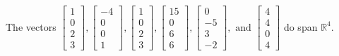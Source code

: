 \begin{exercise}
\begin{exerciseStatement}
  \end{exerciseStatement}
  \begin{exerciseAnswer}
   The vectors \(\left[\begin{array}{r}
1 \\
0 \\
2 \\
3
\end{array}\right] , \left[\begin{array}{r}
-4 \\
0 \\
0 \\
1
\end{array}\right] , \left[\begin{array}{r}
1 \\
0 \\
2 \\
3
\end{array}\right] , \left[\begin{array}{r}
15 \\
0 \\
6 \\
6
\end{array}\right] , \left[\begin{array}{r}
0 \\
-5 \\
3 \\
-2
\end{array}\right] , \text{ and } \left[\begin{array}{r}
4 \\
4 \\
0 \\
4
\end{array}\right]\) 
  	 do  
	span \(\mathbb{R}^4\).
  


  \end{exerciseAnswer}
\end{exercise}